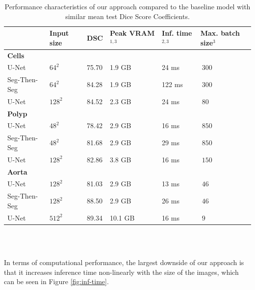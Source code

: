\begin{table}[b!]
\caption{Performance characteristics of our approach compared to the baseline model with similar mean test Dice Score Coefficients.\label{tab:performance}}
		\begin{tabularx}{\textwidth}{lCCCCC}
			& \textbf{Input size} & \textbf{DSC} & \textbf{Peak VRAM$^{1, 3}$} & \textbf{Inf. time$^{2, 3}$} & \textbf{Max. batch size$^{3}$}\\
			\toprule
			\textbf{Cells} & & & & & \\
			\midrule
			U-Net & $64^2$ & 75.70 & 1.9 GB & 24 ms & $~300$\\
			Seg-Then-Seg & $64^2$ & 84.28 & 1.9 GB & 122 ms & $~300$\\
			U-Net & $128^2$ & 84.52 & 2.3 GB & 24 ms & $~80$\\
			
			\toprule
			\textbf{Polyp} & & & & & \\
			\midrule
			U-Net 		 & $48^2$ 	& 78.42 & 2.9 GB & 16 ms & $~850$\\
			Seg-Then-Seg & $48^2$ 	& 81.68 & 2.9 GB & 29 ms & $~850$\\
			U-Net 		 & $128^2$ 	& 82.86 & 3.8 GB & 16 ms & $~150$\\
						
			\toprule
			\textbf{Aorta} & & & & & \\
			\midrule
			U-Net 		 & $128^2$ 	& 81.03 & 2.9 GB  & 13 ms & $~46$\\
			Seg-Then-Seg & $128^2$ 	& 88.50 & 2.9 GB  & 26 ms & $~46$\\
			U-Net 		 & $512^2$ 	& 89.34 & 10.1 GB & 16 ms & $~9$\\
			\bottomrule
		\end{tabularx}
		 \\
		 \\
\end{table}

In terms of computational performance, the largest downside of our approach is that it increases inference time non-linearly with the size of the images, which can be seen in Figure \ref{fig:inf-time}.

